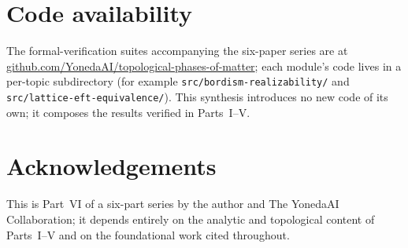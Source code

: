 \documentclass[12pt]{article}
\theoremstyle{plain}
\theoremstyle{definition}
\theoremstyle{remark}
\begin{document}
\section*{Code availability}
{
\begin{sloppypar}
The formal-verification suites accompanying the six-paper series are at
\href{https://github.com/YonedaAI/topological-phases-of-matter}{github.com/\allowbreak YonedaAI/\allowbreak topological-phases-of-matter};
each module's code lives in a per-topic subdirectory (for example
\texttt{src/\allowbreak bordism-realizability/} and
\texttt{src/\allowbreak lattice-eft-\allowbreak equivalence/}). This synthesis introduces no
new code of its own; it composes the results verified in Parts~I--V.
\end{sloppypar}}

\section*{Acknowledgements}
This is Part~VI of a six-part series by the author and The YonedaAI Collaboration; it
depends entirely on the analytic and topological content of Parts~I--V and on the
foundational work cited throughout.



\end{document}
